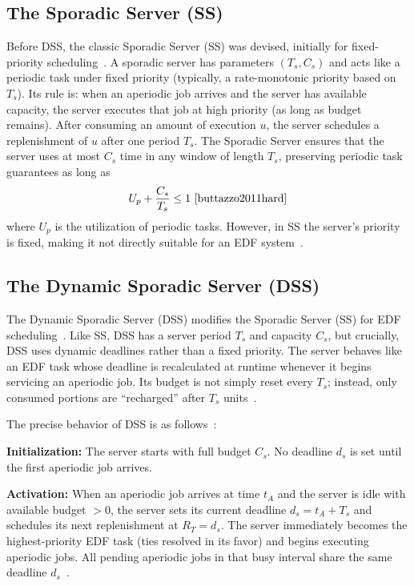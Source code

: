 \documentclass[conference]{IEEEtran}
\begin{document}
\subsection{The Sporadic Server (SS)}
Before DSS, the classic Sporadic Server (SS) was devised, initially for fixed-priority scheduling~\cite{buttazzo2011hard}. 
A sporadic server has parameters $(T_s, C_s)$ and acts like a periodic task under fixed priority (typically, a rate-monotonic priority based on $T_s$). 
Its rule is: when an aperiodic job arrives and the server has available capacity, the server executes that job at high priority (as long as budget remains). 
After consuming an amount of execution $u$, the server schedules a replenishment of $u$ after one period $T_s$. 
The Sporadic Server ensures that the server uses at most $C_s$ time in any window of length $T_s$, preserving periodic task guarantees as long as
\[
U_p + \frac{C_s}{T_s} \leq 1
\ \cite{buttazzo2011hard} \]
where $U_p$ is the utilization of periodic tasks. However, in SS the server’s priority is fixed, making it not directly suitable for an EDF system~\cite{buttazzo2011hard}.

\subsection{The Dynamic Sporadic Server (DSS)}
The Dynamic Sporadic Server (DSS) modifies the Sporadic Server (SS) for EDF scheduling~\cite{spuri1994efficient}. 
Like SS, DSS has a server period $T_s$ and capacity $C_s$, but crucially, DSS uses dynamic deadlines rather than a fixed priority. 
The server behaves like an EDF task whose deadline is recalculated at runtime whenever it begins servicing an aperiodic job. 
Its budget is not simply reset every $T_s$; instead, only consumed portions are ``recharged'' after $T_s$ units~\cite{spuri1994efficient,buttazzo2011hard}.

The precise behavior of DSS is as follows~\cite{spuri1994efficient,buttazzo2011hard}:

\textbf{Initialization:} The server starts with full budget $C_s$. No deadline $d_s$ is set until the first aperiodic job arrives.

\textbf{Activation:} When an aperiodic job arrives at time $t_A$ and the server is idle with available budget $>0$, the server sets its current deadline $d_s = t_A + T_s$ and schedules its next replenishment at $R_T = d_s$. 
The server immediately becomes the highest-priority EDF task (ties resolved in its favor) and begins executing aperiodic jobs. 
All pending aperiodic jobs in that busy interval share the same deadline $d_s$~\cite{spuri1994efficient}.
\end{document}
